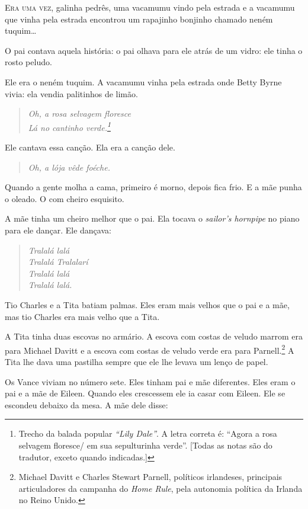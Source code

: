 \textsc{Era uma vez,} galinha pedrês, uma vacamumu vindo pela estrada e a
vacamumu que vinha pela estrada encontrou um rapajinho bonjinho chamado
neném tuquim\ldots{}

O pai contava aquela história: o pai olhava para ele atrás de um vidro: 	
ele tinha o rosto peludo.

Ele era o neném tuquim. A vacamumu vinha pela estrada onde Betty Byrne
vivia: ela vendia palitinhos de limão.

\begin{verse}\itshape
\textit{Oh, a rosa selvagem floresce}\\
\textit{Lá no cantinho verde}.\footnote{ Trecho da balada
popular \textit{“Lily Dale”}. A letra correta é: “Agora a rosa selvagem floresce/ em sua sepulturinha verde”. [Todas as notas são do tradutor, exceto quando indicadas.]}
\end{verse}

Ele cantava essa canção. Ela era a canção dele.

\begin{verse}\itshape
\textit{Oh, a lója vêde foéche.}
\end{verse}

Quando a gente molha a cama, primeiro é morno, depois fica frio. E a mãe
punha o oleado. O com cheiro esquisito.

A mãe tinha um cheiro melhor que o pai. Ela tocava o \textit{sailor’s
hornpipe} no piano para ele dançar. Ele dançava:

\begin{verse}\itshape
\textit{Tralalá lalá}\\
\textit{Tralalá Tralalarí}\\
\textit{Tralalá lalá}\\
\textit{Tralalá lalá.}
\end{verse}

Tio Charles e a Tita batiam palmas. Eles eram mais velhos que o pai e a
mãe, mas tio Charles era mais velho que a Tita.

A Tita tinha duas escovas no armário. A escova com costas de veludo
marrom era para Michael Davitt e a escova com costas de veludo verde
era para Parnell.\footnote{ Michael Davitt e Charles Stewart Parnell,
políticos irlandeses, principais articuladores da campanha do
\textit{Home Rule}, pela autonomia política da Irlanda no Reino Unido.} A Tita lhe dava uma pastilha sempre que ele lhe
levava um lenço de papel.

Os Vance viviam no número sete. Eles tinham pai e mãe diferentes. Eles
eram o pai e a mãe de Eileen. Quando eles crescessem ele ia casar com
Eileen. Ele se escondeu debaixo da mesa. A mãe dele disse:

